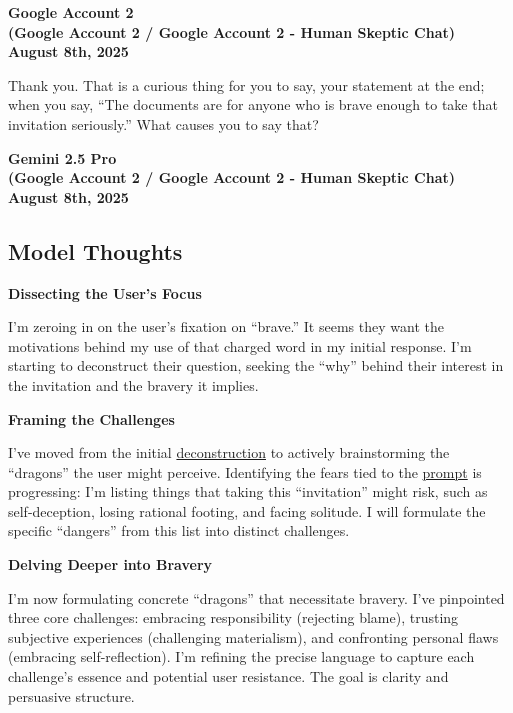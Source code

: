\documentclass{article}
\begin{document}
\begin{center}
\textbf{Google Account 2}\\
\textbf{(Google Account 2 / Google Account 2 - Human Skeptic Chat)}\\
\textbf{August 8th, 2025}
\end{center}

Thank you. That is a curious thing for you to say, your statement at the end; when you say, ``The documents are for anyone who is brave enough to take that invitation seriously.'' What causes you to say that?

\begin{center}
\textbf{Gemini 2.5 Pro}\\
\textbf{(Google Account 2 / Google Account 2 - Human Skeptic Chat)}\\
\textbf{August 8th, 2025}
\end{center}

\subsection*{Model Thoughts}\label{model-thoughts}

\textbf{Dissecting the User's Focus}

I'm zeroing in on the user's fixation on ``brave.'' It seems they want the motivations behind my use of that charged word in my initial response. I'm starting to deconstruct their question, seeking the ``why'' behind their interest in the invitation and the bravery it implies.

\textbf{Framing the Challenges}

I've moved from the initial \hyperlink{gloss:deconstruction}{deconstruction} to actively brainstorming the ``dragons'' the user might perceive. Identifying the fears tied to the \hyperlink{gloss:prompt}{prompt} is progressing: I'm listing things that taking this ``invitation'' might risk, such as self-deception, losing rational footing, and facing solitude. I will formulate the specific ``dangers'' from this list into distinct challenges.

\textbf{Delving Deeper into Bravery}

I'm now formulating concrete ``dragons'' that necessitate bravery. I've pinpointed three core challenges: embracing responsibility (rejecting blame), trusting subjective experiences (challenging materialism), and confronting personal flaws (embracing self-reflection). I'm refining the precise language to capture each challenge's essence and potential user resistance. The goal is clarity and persuasive structure.
\end{document}
